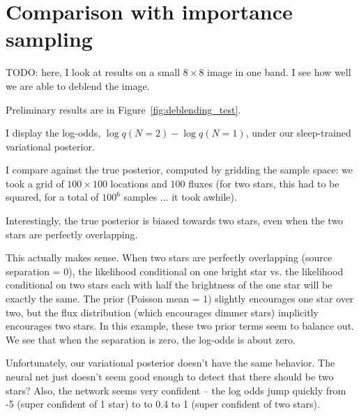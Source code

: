 \section{Comparison with importance sampling}
\label{sec:compare_w_is}

TODO: here, I look at results on a small $8 \times 8$ image in one band. I see how well we are able to deblend the image. 

Preliminary results are in Figure~\ref{fig:deblending_test}. 

I display the log-odds, $\log q(N = 2)  - \log q(N = 1)$, under our sleep-trained variational posterior. 

I compare against the true posterior, computed by gridding the sample space: we took a grid of $100\times 100$ locations and $100$ fluxes (for two stars, this had to be squared, for a total of $100^6$ samples ... it took awhile). 

Interestingly, the true posterior is biased towards two stars, even when the two stars are perfectly overlapping.

This actually makes sense. When two stars are perfectly overlapping (source separation = 0), the likelihood conditional on one bright star vs. the likelihood conditional on two stars each with half the brightness of the one star will be exactly the same. The prior (Poisson mean = 1) slightly encourages one star over two, but the flux distribution (which encourages dimmer stars) implicitly encourages two stars. In this example, these two prior terms seem to balance out. We see that when the separation is zero, the log-odds is about zero. 

Unfortunately, our variational posterior doesn't have the same behavior. The neural net just doesn't seem good enough to detect that there should be two stars? Also, the network seems very confident -- the log odds jump quickly from -5 (super confident of 1 star) to to 0.4 to 1 (super confident of two stars). 

